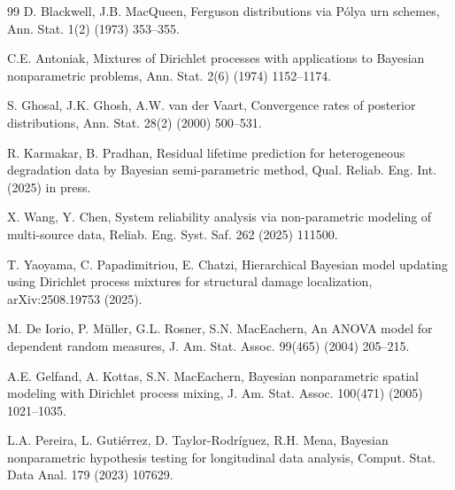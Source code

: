 \documentclass[a4paper,fleqn,longmktitle]{cas-sc}
\begin{document}
\begin{thebibliography}{99}
D. Blackwell, J.B. MacQueen, Ferguson distributions via P\'{o}lya urn schemes, Ann. Stat. 1(2) (1973) 353--355.





C.E. Antoniak, Mixtures of Dirichlet processes with applications to Bayesian nonparametric problems, Ann. Stat. 2(6) (1974) 1152--1174.





S. Ghosal, J.K. Ghosh, A.W. van der Vaart, Convergence rates of posterior distributions, Ann. Stat. 28(2) (2000) 500--531.





R. Karmakar, B. Pradhan, Residual lifetime prediction for heterogeneous degradation data by Bayesian semi-parametric method, Qual. Reliab. Eng. Int. (2025) in press.





X. Wang, Y. Chen, System reliability analysis via non-parametric modeling of multi-source data, Reliab. Eng. Syst. Saf. 262 (2025) 111500.





T. Yaoyama, C. Papadimitriou, E. Chatzi, Hierarchical Bayesian model updating using Dirichlet process mixtures for structural damage localization, arXiv:2508.19753 (2025).





M. De Iorio, P. M\"uller, G.L. Rosner, S.N. MacEachern, An ANOVA model for dependent random measures, J. Am. Stat. Assoc. 99(465) (2004) 205--215.





A.E. Gelfand, A. Kottas, S.N. MacEachern, Bayesian nonparametric spatial modeling with Dirichlet process mixing, J. Am. Stat. Assoc. 100(471) (2005) 1021--1035.





L.A. Pereira, L. Guti\'{e}rrez, D. Taylor-Rodr\'{i}guez, R.H. Mena, Bayesian nonparametric hypothesis testing for longitudinal data analysis, Comput. Stat. Data Anal. 179 (2023) 107629.






\end{thebibliography}
\end{document}
